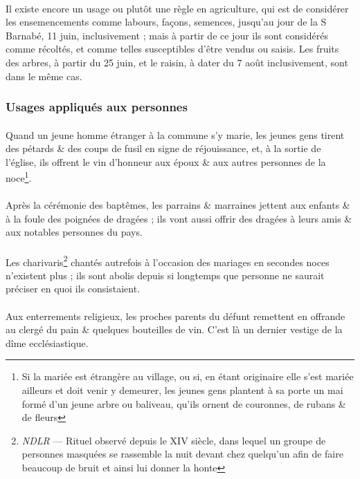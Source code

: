 \documentclass[../eBook.tex]{subfiles}
\begin{document}
      \paragraph{}Il existe encore un usage ou plutôt une règle en agriculture, qui est de considérer les ensemencements comme labours, façons, semences, jusqu'au jour de la S Barnabé, 11 juin, inclusivement ; mais à partir de ce jour ils sont considérés comme récoltés, et comme telles susceptibles d'être vendus ou saisis. Les fruits des arbres, à partir du 25 juin, et le raisin, à dater du 7 août inclusivement, sont dans le même cas.

    \subsubsection*{Usages appliqués aux personnes}
      \paragraph{}Quand un jeune homme étranger à la commune s'y marie, les jeunes gens tirent des pétards \& des coups de fusil en signe de réjouissance, et, à la sortie de l'église, ils offrent le vin d'honneur aux époux \& aux autres personnes de la noce\footnote{Si la mariée est étrangère au village, ou si, en étant originaire elle s'est mariée ailleurs et doit venir y demeurer, les jeunes gens plantent à sa porte un mai formé d'un jeune arbre ou baliveau, qu'ils ornent de couronnes, de rubans \& de fleurs}.
      \paragraph{}Après la cérémonie des baptêmes, les parrains \& marraines jettent aux enfants \& à la foule des poignées de dragées ; ils vont aussi offrir des dragées à leurs amis \& aux notables personnes du pays.
      \paragraph{}Les charivaris\footnote{\textit{NDLR} --- Rituel observé depuis le XIV siècle, dans lequel un groupe de personnes masquées se rassemble la nuit devant chez quelqu'un afin de faire beaucoup de bruit et ainsi lui donner la honte} chantés autrefois à l'occasion des mariages en secondes noces n'existent plus ; ils sont abolis depuis si longtemps que personne ne saurait préciser en quoi ils consistaient.
      \paragraph{}Aux enterrements religieux, les proches parents du défunt remettent en offrande au clergé du pain \& quelques bouteilles de vin. C'est là un dernier vestige de la dîme ecclésiastique.
\end{document}
